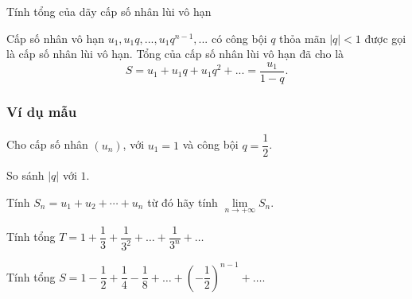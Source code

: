 \begin{dang}{Tính tổng của dãy cấp số nhân lùi vô hạn}
	\begin{dn}
		Cấp số nhân vô hạn $u_1, u_1q,...,u_1q^{n-1},...$ có công bội $q$ thỏa mãn $|q|<1$ được gọi là cấp số nhân lùi vô hạn. 
		Tổng của cấp số nhân lùi vô hạn đã cho là $$S=u_1+u_1q+u_1q^2+...=\dfrac{u_1}{1-q}.$$
	\end{dn}
\end{dang}
\subsubsection{Ví dụ mẫu}
\begin{vd}%
	Cho cấp số nhân $(u_n)$, với $u_1=1$ và công bội $q=\dfrac{1}{2}$.
	\begin{enumEX}{1}
		\item So sánh $\left|q\right|$ với $1$.
		\item Tính $S_n=u_1+u_2+\cdots+u_n$ từ đó hãy tính $\lim \limits_{n \to +\infty}S_n$.
	\end{enumEX}
\end{vd}
\begin{vd}%
	Tính tổng $T=1+\dfrac{1}{3}+\dfrac{1}{3^2}+\ldots+\dfrac{1}{3^n}+\ldots$
\end{vd}
\begin{vd}
	Tính tổng $S=1-\dfrac{1}{2}+\dfrac{1}{4}-\dfrac{1}{8}+\ldots+\left(-\dfrac{1}{2}\right)^{n-1}+\ldots$.
\end{vd}

